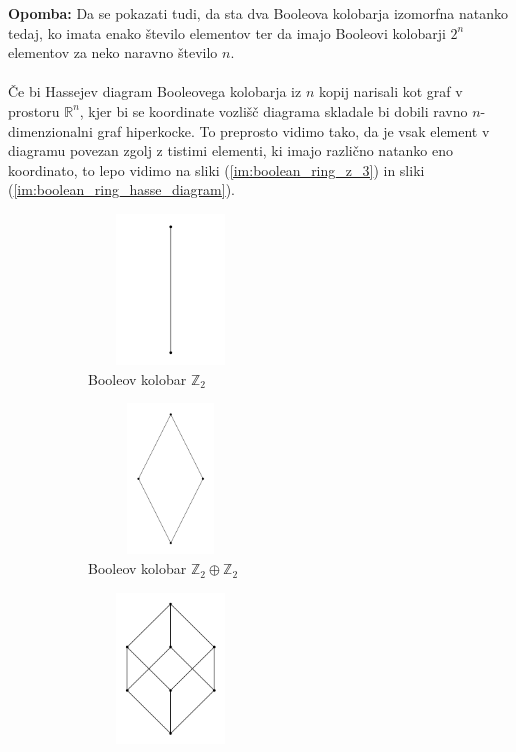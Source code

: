 \documentclass[a4paper]{article}
\newcounter{environment:definition_counter}
\newcounter{environment:theorem_counter}
\newcounter{environment:statement_counter}
\newenvironment{remark}
{\textbf{Opomba: }}
{}
\begin{document}
\begin{remark}
Da se pokazati tudi, da sta dva Booleova kolobarja izomorfna natanko tedaj, ko imata enako število elementov ter da imajo Booleovi kolobarji $2^n$ elementov za neko naravno število $n$.
\end{remark}
\\
\\
Če bi Hassejev diagram Booleovega kolobarja iz $n$ kopij narisali kot graf v prostoru $\mathbb{R}^n$, kjer bi se koordinate vozlišč diagrama skladale bi dobili ravno $n$-dimenzionalni graf hiperkocke. To preprosto vidimo tako, da je vsak element v diagramu povezan zgolj z tistimi elementi, ki imajo različno natanko eno koordinato, to lepo vidimo na sliki (\ref{im:boolean_ring_z_3}) in sliki (\ref{im:boolean_ring_hasse_diagram}).
\begin{figure}[h]
\begin{subfigure}[b]{0.5\textwidth}
\centering
\includegraphics[width=0.48\textwidth, height=4cm]{bool1}
\caption{Booleov kolobar $\mathbb{Z}_2$}
\end{subfigure}
\hfill
\begin{subfigure}[b]{0.5\textwidth}
\centering
\includegraphics[width=0.48\textwidth, height=4cm]{bool2}
\caption{Booleov kolobar $\mathbb{Z}_2 \oplus \mathbb{Z}_2$}
\end{subfigure}
\begin{subfigure}[b]{0.5\textwidth}
\centering
\includegraphics[width=0.48\textwidth, height=4cm]{bool3}

\end{subfigure}
\end{figure}
\end{document}
